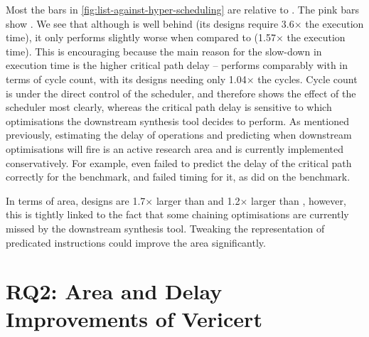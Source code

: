 Most the bars in \cref{fig:list-against-hyper-scheduling} are relative to
\BambuDefault. The pink bars show \BambuNoOpt. We see that although
\VericertHyper{} is well behind \BambuDefault{} (its designs require 3.6$\times$
the execution time), it only performs slightly worse when compared to
\BambuNoOpt{} (1.57$\times$ the execution time).  This is encouraging because
the main reason for the slow-down in execution time is the higher critical path
delay -- \VericertHyper{} performs comparably with \BambuNoOpt{} in terms of
cycle count, with its designs needing only 1.04$\times$ the cycles.  Cycle count
is under the direct control of the scheduler, and therefore shows the effect of
the scheduler most clearly, whereas the critical path delay is sensitive to
which optimisations the downstream synthesis tool decides to perform.  As
mentioned previously, estimating the delay of operations and predicting when
downstream optimisations will fire is an active research area and is currently
implemented conservatively.  For example, even \BambuNoOpt{} failed to predict
the delay of the critical path correctly for the  benchmark,
and failed timing for it, as did \VericertList{} on the 
benchmark.

In terms of area, \VericertHyper{} designs are 1.7$\times$ larger than
\BambuDefault{} and 1.2$\times$ larger than \BambuNoOpt{}, however, this is
tightly linked to the fact that some chaining optimisations are currently missed
by the downstream synthesis tool.  Tweaking the representation of predicated
instructions could improve the area significantly.

\section{RQ2: Area and Delay Improvements of Vericert}


